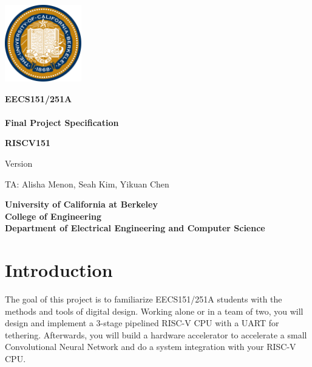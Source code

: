 \documentclass[11pt]{article}
\begin{document}
\clearpage
\thispagestyle{empty}

\begin{center}
\includegraphics[width=0.25\textwidth]{images/Seal_of_University_of_California_Berkeley.png}
\end{center}
\begin{center}
\LARGE{
\color{gray}
\bf EECS151/251A \\
\currentSemester\\
Final Project Specification\\
}
\end{center}

\vfill


\begin{center}
\color{berkeleyblue}
\Huge
{\bf RISCV151 }  \\
\end{center}

\vfill

\begin{center}
\LARGE{
\color{gray}
Version \projectSpecVersion\\}
\end{center}

\vspace{3mm}

\begin{center}
\large{
TA: Alisha Menon, Seah Kim, Yikuan Chen}
\end{center}

\begin{center}
\large{
\bf
University of California at Berkeley \\
College of Engineering \\
Department of Electrical Engineering and Computer Science \\
}
\end{center}

\newpage
{}
\tableofcontents

\newpage

\section{Introduction}
The goal of this project is to familiarize EECS151/251A students with the methods and tools of digital design.
Working alone or in a team of two, you will design and implement a 3-stage pipelined RISC-V CPU with a UART for tethering.
Afterwards, you will build a hardware accelerator to accelerate a small Convolutional Neural Network and do a system integration with your RISC-V CPU.
\end{document}

